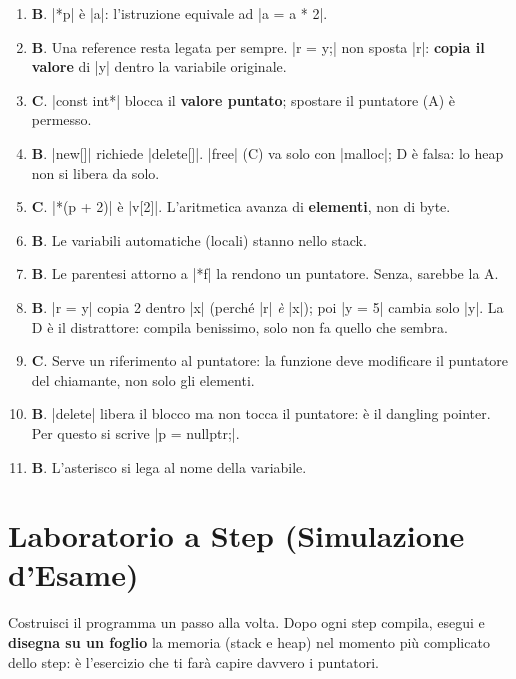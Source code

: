 \begin{soluzione}
\begin{enumerate}[label=\textbf{\arabic*.}]
  \item \textbf{B}. \cc|*p| è \cc|a|: l'istruzione equivale ad \cc|a = a * 2|.
  \item \textbf{B}. Una reference resta legata per sempre. \cc|r = y;| non
        sposta \cc|r|: \textbf{copia il valore} di \cc|y| dentro la variabile originale.
  \item \textbf{C}. \cc|const int*| blocca il \textbf{valore puntato}; spostare il
        puntatore (A) è permesso.
  \item \textbf{B}. \cc|new[]| richiede \cc|delete[]|. \cc|free| (C) va solo con
        \cc|malloc|; D è falsa: lo heap non si libera da solo.
  \item \textbf{C}. \cc|*(p + 2)| è \cc|v[2]|. L'aritmetica avanza di
        \textbf{elementi}, non di byte.
  \item \textbf{B}. Le variabili automatiche (locali) stanno nello stack.
  \item \textbf{B}. Le parentesi attorno a \cc|*f| la rendono un puntatore. Senza,
        sarebbe la A.
  \item \textbf{B}. \cc|r = y| copia 2 dentro \cc|x| (perché \cc|r| \emph{è}
        \cc|x|); poi \cc|y = 5| cambia solo \cc|y|. La D è il distrattore: compila
        benissimo, solo non fa quello che sembra.
  \item \textbf{C}. Serve un riferimento al puntatore: la funzione deve modificare
        il puntatore del chiamante, non solo gli elementi.
  \item \textbf{B}. \cc|delete| libera il blocco ma non tocca il puntatore: è il
        dangling pointer. Per questo si scrive \cc|p = nullptr;|.
  \item \textbf{B}. L'asterisco si lega al nome della variabile.
\end{enumerate}
\end{soluzione}

\section{Laboratorio a Step (Simulazione d'Esame)}

Costruisci il programma un passo alla volta. Dopo ogni step compila, esegui e
\textbf{disegna su un foglio} la memoria (stack e heap) nel momento più
complicato dello step: è l'esercizio che ti farà capire davvero i puntatori.

